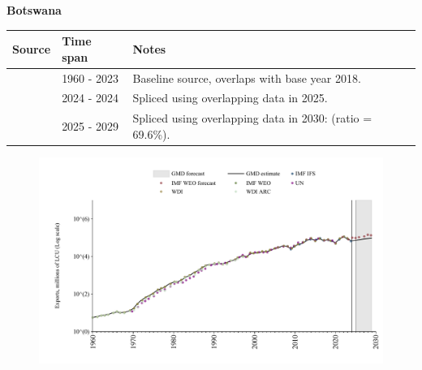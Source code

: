 \documentclass[12pt,a4paper,landscape]{article}
\begin{document}
\begin{adjustbox}{max totalsize={\paperwidth}{\paperheight},center}
\begin{minipage}[t][\textheight][t]{\textwidth}
\vspace*{0.5cm}
{}
\begin{center}
{\Large\bfseries Botswana}
\end{center}
\vspace{0.5cm}
\begin{table}[H]
\centering
\small
\begin{tabular}{|l|l|l|}
\hline
\textbf{Source} & \textbf{Time span} & \textbf{Notes} \\
\hline
\rowcolor{white}\cite{WDI}& 1960 - 2023 &Baseline source, overlaps with base year 2018.\\
\rowcolor{lightgray}\cite{IMF_IFS}& 2024 - 2024 &Spliced using overlapping data in 2025.\\
\rowcolor{white}\cite{IMF_WEO_forecast}& 2025 - 2029 &Spliced using overlapping data in 2030: (ratio = 69.6\%).\\
\hline
\end{tabular}
\end{table}
\begin{figure}[H]
\centering
\includegraphics[width=\textwidth,height=0.6\textheight,keepaspectratio]{graphs/BWA_exports.pdf}
\end{figure}
\end{minipage}
\end{adjustbox}
\end{document}
